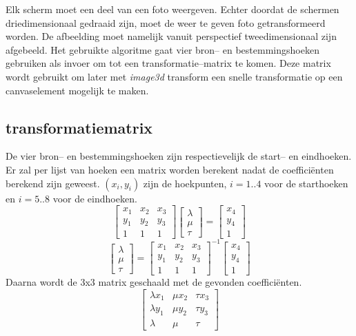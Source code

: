 

	Elk scherm moet een deel van een foto weergeven. Echter doordat de schermen driedimensionaal gedraaid zijn, moet de weer te geven foto getransformeerd worden. De afbeelding moet namelijk vanuit perspectief tweedimensionaal zijn afgebeeld. Het gebruikte algoritme gaat vier bron-- en bestemmingshoeken gebruiken als invoer om tot een transformatie--matrix te komen. Deze matrix wordt gebruikt om later met {\it image3d} transform een snelle transformatie op een canvaselement mogelijk te maken.


\subsection{transformatiematrix}
De vier bron-- en bestemmingshoeken zijn respectievelijk de start-- en eindhoeken. Er zal per lijst van hoeken een matrix worden berekent nadat de coefficiënten berekend zijn geweest. $(x_i, y_i)$ zijn de hoekpunten, $i = 1..4$ voor de starthoeken en $i = 5..8$ voor de eindhoeken. \cite{redrawImageFrom3dPerspectiveTo2d}
$$ \begin{bmatrix}
x_1 & x_2 & x_3 \\ y_1 & y_2 & y_3 \\ 1 & 1 & 1
\end{bmatrix} \begin{bmatrix}
\lambda \\ \mu \\ \tau
\end{bmatrix} =
\begin{bmatrix}
x_4 \\ y_4 \\ 1
\end{bmatrix}
$$
$$ \begin{bmatrix}
\lambda \\ \mu \\ \tau
\end{bmatrix} =\begin{bmatrix}
x_1 & x_2 & x_3 \\ y_1 & y_2 & y_3 \\ 1 & 1 & 1
\end{bmatrix}^{-1}
\begin{bmatrix}
x_4 \\ y_4 \\ 1
\end{bmatrix}
$$
Daarna wordt de 3x3 matrix geschaald met de gevonden coefficiënten.
$$
\begin{bmatrix}
\lambda x_1 & \mu x_2 & \tau x_3 \\ \lambda y_1 & \mu y_2 & \tau y_3 \\ \lambda & \mu & \tau
\end{bmatrix}
$$
